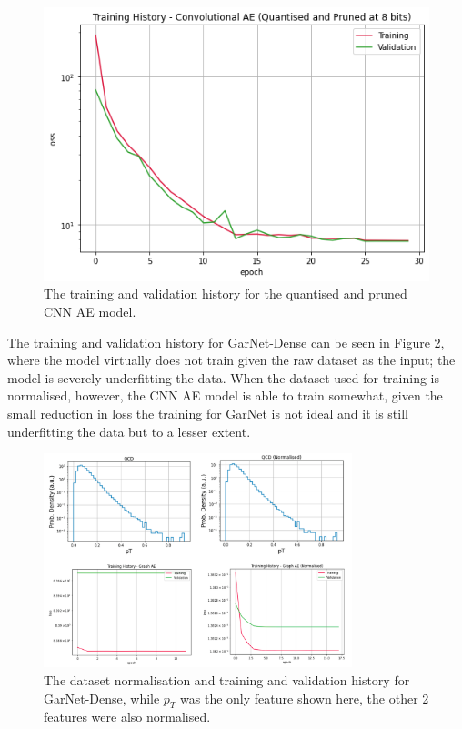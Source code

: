 \documentclass[a4paper]{article}
\theoremstyle{plain}
\theoremstyle{definition}
\begin{document}
\begin{figure}[H]
\begin{minipage}[c]{0.45\linewidth}
                    \includegraphics[width=\textwidth]{cnn-compressed-training.png}
                    \caption{The training and validation history for the quantised and pruned CNN AE model.}
                    \label{fig:cnn-compressed-training}
                \end{minipage}
            \end{figure}

            The training and validation history for GarNet-Dense can be seen in Figure \ref{fig:garnet-training}, where the model virtually does not train given the raw dataset as the input; the model is severely underfitting the data. When the dataset used for training is normalised, however, the CNN AE model is able to train somewhat, given the small reduction in loss the training for GarNet is not ideal and it is still underfitting the data but to a lesser extent. 

            \begin{figure}[H]
                \centering
                \begin{minipage}[b]{\linewidth}
                    \centering
                    \includegraphics[width=0.8\textwidth]{garnet-training.png}
                    \caption{The dataset normalisation and training and validation history for GarNet-Dense, while $p_T$ was the only feature shown here, the other 2 features were also normalised.}
                    \label{fig:garnet-training}
                \end{minipage}
            \end{figure}
\end{document}
